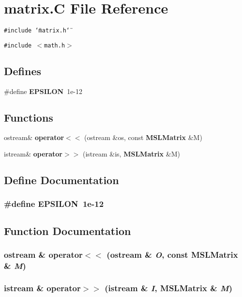 \section{matrix.C File Reference}
\label{matrix_8C}
{\tt \#include \char`\"{}matrix.h\char`\"{}}\par
{\tt \#include $<$math.h$>$}\par
\subsection*{Defines}
\begin{CompactItemize}
\item 
\#define {\bf EPSILON}\ 1e-12
\end{CompactItemize}
\subsection*{Functions}
\begin{CompactItemize}
\item 
ostream\& {\bf operator$<$$<$} (ostream \&os, const {\bf MSLMatrix} \&M)
\item 
istream\& {\bf operator$>$$>$} (istream \&is, {\bf MSLMatrix} \&M)
\end{CompactItemize}


\subsection{Define Documentation}
\subsubsection{\setlength{\rightskip}{0pt plus 5cm}\#define EPSILON\ 1e-12}\label{matrix_8C_a0}




\subsection{Function Documentation}
\subsubsection{\setlength{\rightskip}{0pt plus 5cm}ostream \& operator$<$$<$ (ostream \& {\em O}, const {\bf MSLMatrix} \& {\em M})}\label{matrix_8C_a1}


\subsubsection{\setlength{\rightskip}{0pt plus 5cm}istream \& operator$>$$>$ (istream \& {\em I}, {\bf MSLMatrix} \& {\em M})}\label{matrix_8C_a2}


